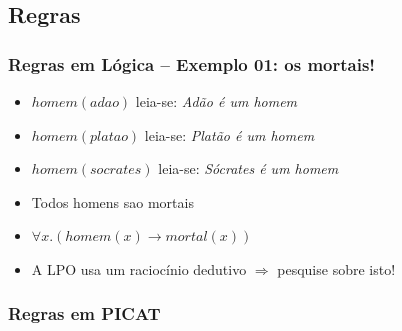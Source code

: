 \documentclass[10pt]{beamer}
\begin{document}
\subsection{Regras}
\begin{frame}
    \frametitle{Regras  em Lógica -- Exemplo 01: os mortais!}
    \begin{itemize}
    \item $homem(adao)$ \hspace{2cm} leia-se: \textit{Adão é um homem}         
    \item $homem(platao)$ \hspace{2cm} leia-se: \textit{Platão é um homem}
    \item $homem(socrates)$ \hspace{2cm} leia-se: \textit{Sócrates é um homem}

    \item Todos homens sao mortais
    \pause
    \item $\forall x . (homem(x) \rightarrow mortal(x))$
    \item A LPO usa um raciocínio dedutivo $\Rightarrow $ pesquise sobre isto!

    \end{itemize}
\end{frame}

\begin{frame}[allowframebreaks=0.9]
 \frametitle{Regras em PICAT}


\end{frame}

\end{document}
